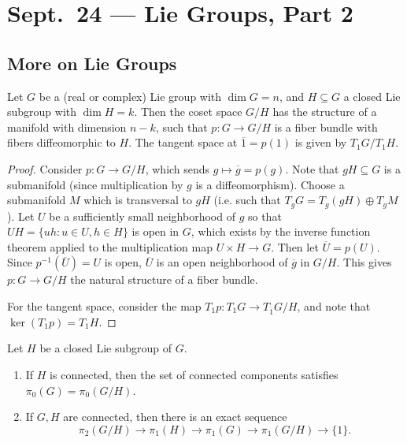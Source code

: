 \chapter{Sept.~24 --- Lie Groups, Part 2}

\section{More on Lie Groups}

\begin{theorem}
  Let $G$ be a (real or complex) Lie group
  with $\dim G = n$, and
  $H \subseteq G$ a closed Lie subgroup
  with $\dim H = k$. Then the coset
  space $G / H$ has the structure of a
  manifold with dimension $n - k$, such
  that $p : G \to G / H$ is a fiber
  bundle with fibers diffeomorphic
  to $H$. The tangent space at $\overline{1} = p(1)$
  is given by $T_1 G / T_1 H$.
\end{theorem}

\begin{proof}
  Consider $p : G \to G / H$, which
  sends $g \mapsto \overline{g} = p(g)$.
  Note that $gH \subseteq G$ is a
  submanifold (since multiplication by
  $g$ is a diffeomorphism). Choose a
  submanifold $M$ which is transversal
  to $gH$ (i.e. such that
  $T_g G = T_g(gH) \oplus T_g M$).
  Let $U$ be a
  sufficiently small neighborhood of $g$
  so that $UH = \{uh : u \in U, h \in H\}$
  is open in $G$, which exists by the
  inverse function theorem applied to
  the multiplication map
  $U \times H \to G$. Then let
  $\overline{U} = p(U)$. Since
  $p^{-1}(\overline{U}) = U$ is open,
  $\overline{U}$ is an open neighborhood
  of $\overline{g}$ in $G / H$.
  This gives $p : G \to G / H$ the
  natural structure of a fiber bundle.

  For the tangent space, consider
  the map $T_1 p : T_1 G \to T_{\overline{1}} G / H$, and
  note that
  $\ker(T_1 p) = T_1 H$.
\end{proof}

\begin{corollary}
  Let $H$ be a closed Lie subgroup of $G$.
  \begin{enumerate}
    \item If $H$ is connected, then
      the set of connected components
      satisfies $\pi_0(G) = \pi_0(G / H)$.
    \item If $G, H$ are connected, then
      there is an exact sequence
      \[
        \pi_2(G / H)
        \longrightarrow \pi_1(H)
        \longrightarrow \pi_1(G)
        \longrightarrow \pi_1(G / H)
        \longrightarrow \{1\}.
      \]
  \end{enumerate}
\end{corollary}

